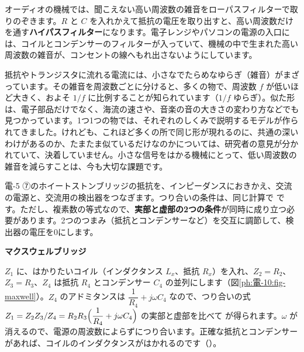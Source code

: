 \begin{phmijika}
オーディオの機械では、聞こえない高い周波数の雑音をローパスフィルターで取りのぞきます。$R$ と $C$ を入れかえて抵抗の電圧を取り出すと、高い周波数だけを通す\textbf{ハイパスフィルター}になります。電子レンジやパソコンの電源の入口には、コイルとコンデンサーのフィルターが入っていて、機械の中で生まれた高い周波数の雑音が、コンセントの線へもれ出さないようにしています。
\end{phmijika}

\begin{phmada}
抵抗やトランジスタに流れる電流には、小さなでたらめなゆらぎ（雑音）がまざっています。その雑音を周波数ごとに分けると、多くの物で、周波数 $f$ が低いほど大きく、およそ $1/f$ に比例することが知られています（$1/f$ ゆらぎ）。似た形は、電子部品だけでなく、海流の速さや、音楽の音の大きさの変わり方などでも見つかっています。1つ1つの物では、それぞれのしくみで説明するモデルが作られてきました。けれども、これほど多くの所で同じ形が現れるのに、共通の深いわけがあるのか、たまたま似ているだけなのかについては、研究者の意見が分かれていて、決着していません。小さな信号をはかる機械にとって、低い周波数の雑音を減らすことは、今も大切な課題です。
\end{phmada}


\leavevmode\label{ph:電-10:sec10}電-5 ⑦のホイートストンブリッジの抵抗を、インピーダンスにおきかえ、交流の電源と、交流用の検出器をつなぎます。つり合いの条件は、同じ計算で
\label{ph:電-10:bridge}です。ただし、複素数の等式なので、\textbf{実部と虚部の2つの条件}が同時に成り立つ必要があります。2つのつまみ（抵抗とコンデンサーなど）を交互に調節して、検出器の電圧を0にします。

\noindent\textbf{マクスウェルブリッジ}\par\nobreak
$Z_1$ に、はかりたいコイル（インダクタンス $L_x$、抵抗 $R_x$）を入れ、$Z_2=R_2$、$Z_3=R_3$、$Z_4$ は抵抗 $R_4$ とコンデンサー $C_4$ の並列にします（図\ref{ph:電-10:fig-maxwell}）。$Z_4$ のアドミタンスは $\dfrac{1}{R_4}+j\omega C_4$ なので、つり合いの式 $Z_1=Z_2Z_3/Z_4=R_2R_3\Bigl(\dfrac{1}{R_4}+j\omega C_4\Bigr)$ の実部と虚部を比べて
\label{ph:電-10:maxwell}が得られます。$\omega$ が消えるので、電源の周波数によらずにつり合います。正確な抵抗とコンデンサーがあれば、コイルのインダクタンスがはかれるのです（）。

